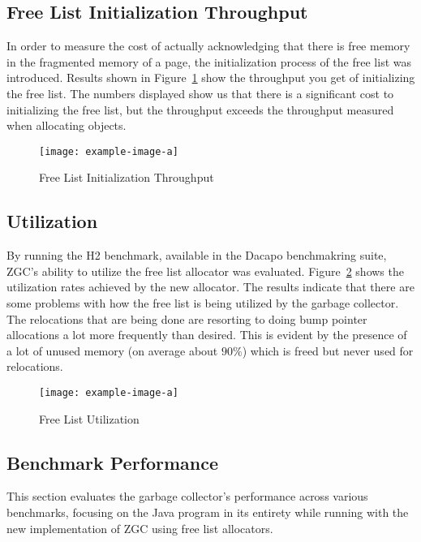 \subsection{Free List Initialization Throughput}

In order to measure the cost of actually acknowledging that there is free memory in the fragmented memory of a page, the initialization process of the free list was introduced. Results shown in Figure~\ref{fig:free-list-initialization} show the throughput you get of initializing the free list. The numbers displayed show us that there is a significant cost to initializing the free list, but the throughput exceeds the throughput measured when allocating objects.

\begin{figure}[h]
\centering
\texttt{[image: example-image-a]}
\caption{Free List Initialization Throughput}
\label{fig:free-list-initialization}
\end{figure}

\subsection{Utilization}

By running the H2 benchmark, available in the Dacapo benchmakring suite, ZGC's ability to utilize the free list allocator was evaluated. Figure~\ref*{fig:free-list-utilization} shows the utilization rates achieved by the new allocator. The results indicate that there are some problems with how the free list is being utilized by the garbage collector. The relocations that are being done are resorting to doing bump pointer allocations a lot more frequently than desired. This is evident by the presence of a lot of unused memory (on average about $90\%$) which is freed but never used for relocations.

\begin{figure}[h]
\centering
\texttt{[image: example-image-a]}
\caption{Free List Utilization}
\label{fig:free-list-utilization}
\end{figure}

\subsection{Benchmark Performance}

This section evaluates the garbage collector's performance across various benchmarks, focusing on the Java program in its entirety while running with the new implementation of ZGC using free list allocators.

